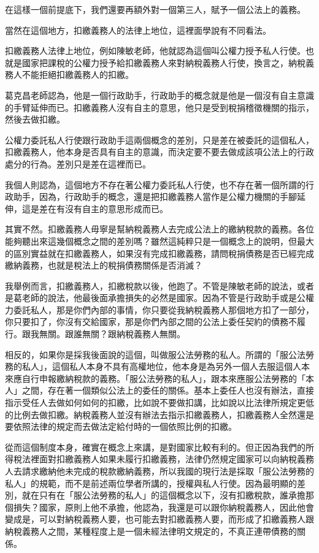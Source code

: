 \documentclass[]{ctexbook}
\begin{document}
在這樣一個前提底下，我們還要再額外對一個第三人，賦予一個公法上的義務。

當然在這個地方，扣繳義務人的法律上地位，這裡面學說有不同看法。

扣繳義務人法律上地位，例如陳敏老師，他就認為這個叫公權力授予私人行使。也就是國家把課稅的公權力授予給扣繳義務人來對納稅義務人行使，換言之，納稅義務人不能拒絕扣繳義務人的扣繳。

葛克昌老師認為，他是一個行政助手，行政助手的概念就是他是一個沒有自主意識的手臂延伸而已。扣繳義務人沒有自主的意思，他只是受到稅捐稽徵機關的指示，然後去做扣繳。

公權力委託私人行使跟行政助手這兩個概念的差別，只是差在被委託的這個私人，扣繳義務人，他本身是否具有自主的意識，而決定要不要去做成該項公法上的行政處分的行為。差別只是差在這裡而已。

我個人則認為，這個地方不存在著公權力委託私人行使，也不存在著一個所謂的行政助手，因為，行政助手的概念，還是把扣繳義務人當作是公權力機關的手腳延伸，這是差在有沒有自主的意思形成而已。

其實不然。扣繳義務人毋寧是幫納稅義務人去完成公法上的繳納稅款的義務。各位能夠聽出來這幾個概念之間的差別嗎？雖然這純粹只是一個概念上的說明，但最大的區別實益就在扣繳義務人，如果沒有完成扣繳義務，請問稅捐債務是否已經完成繳納義務，也就是稅法上的稅捐債務關係是否消滅？

我舉例而言，扣繳義務人，扣繳稅款以後，他跑了。不管是陳敏老師的說法，或者是葛老師的說法，他最後面承擔損失的必然是國家。因為不管是行政助手或是公權力委託私人，那是你們內部的事情，你只要從我納稅義務人那個地方扣了一部分，你只要扣了，你沒有交給國家，那是你們內部之間的公法上委任契約的債務不履行。跟我無關。跟誰無關？跟納稅義務人無關。

相反的，如果你是採我後面說的這個，叫做服公法勞務的私人。所謂的「服公法勞務的私人」，這個私人本身不具有高權地位，他本身是為另外一個人去服這個人本來應自行申報繳納稅款的義務。「服公法勞務的私人」，跟本來應服公法勞務的「本人」之間，存在著一個類似公法上的委任的關係。基本上委任人也沒有辦法，直接指示受任人去做如何如何的扣繳，比如說不要做扣講，比如說以比法律所規定更低的比例去做扣繳。納稅義務人並沒有辦法去指示扣繳義務人，扣繳義務人全然還是要依照法律的規定而去做法定給付時的一個依照比例的扣繳。

從而這個制度本身，確實在概念上來講，是對國家比較有利的。但正因為我們的所得稅法裡面對扣繳義務人如果未履行扣繳義務，法律仍然規定國家可以向納稅義務人去請求繳納他未完成的稅款繳納義務，所以我國的現行法是採取「服公法勞務的私人」的規範，而不是前述兩位學者所講的，授權與私人行使。因為最明顯的差別，就在只有在「服公法勞務的私人」的這個概念以下，沒有扣繳稅款，誰承擔那個損失？國家，原則上他不承擔，他認為，我還是可以跟你納稅義務人，因此他會變成是，可以對納稅義務人要，也可能去對扣繳義務人要，而形成了扣繳義務人跟納稅義務人之間，某種程度上是一個未經法律明文規定的，不真正連帶債務的關係。
\end{document}
